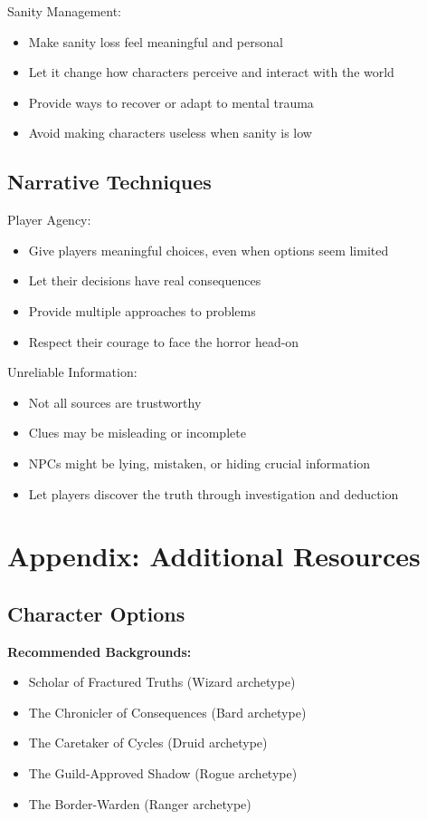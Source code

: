 \documentclass[11pt]{article}
\begin{document}
Sanity Management:
\begin{itemize}
\item Make sanity loss feel meaningful and personal
\item Let it change how characters perceive and interact with the world
\item Provide ways to recover or adapt to mental trauma
\item Avoid making characters useless when sanity is low
\end{itemize}

\subsection{Narrative Techniques}

Player Agency:
\begin{itemize}
\item Give players meaningful choices, even when options seem limited
\item Let their decisions have real consequences
\item Provide multiple approaches to problems
\item Respect their courage to face the horror head-on
\end{itemize}

Unreliable Information:
\begin{itemize}
\item Not all sources are trustworthy
\item Clues may be misleading or incomplete
\item NPCs might be lying, mistaken, or hiding crucial information
\item Let players discover the truth through investigation and deduction
\end{itemize}

\section{Appendix: Additional Resources}

\subsection{Character Options}

\textbf{Recommended Backgrounds:}
\begin{itemize}
\item Scholar of Fractured Truths (Wizard archetype)
\item The Chronicler of Consequences (Bard archetype)
\item The Caretaker of Cycles (Druid archetype)
\item The Guild-Approved Shadow (Rogue archetype)
\item The Border-Warden (Ranger archetype)
\end{itemize}
\end{document}

